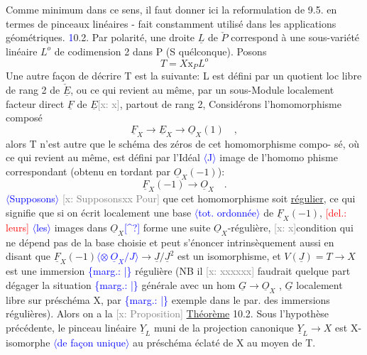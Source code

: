 \documentclass[11pt]{article}
\newcommand{\scanpage}[1]{\par\bigskip\noindent{\small\sffamily[scan #1]}\par}
\newcommand{\mspage}[1]{{\small\sffamily[p.\,#1]}}
\newcommand{\hand}[1]{\textcolor{blue}{#1}}
\let\over\relax
\newcommand{\over}[2]{\textcolor{gray}{#1}\textcolor{blue}{\ensuremath{^{\!\nearrow}}#2}}
\newcommand{\inserted}[2][]{\textcolor{blue}{$\langle$#2$\rangle$}}
\newcommand{\margin}[1]{\textcolor{blue}{\{\textsf{marg.:} #1\}}}
\newcommand{\deleted}[1]{\textcolor{red}{[\textsf{del.:} #1]}}
\newcommand{\xout}[1]{\textcolor{gray}{[\textsf{x:} #1]}}
\newcommand{\uline}[1]{\underline{#1}}
\newcommand{\unsure}[1]{[#1?]}
\begin{document}
\mspage{58}

\clearpage
\scanpage{25/59}
\mspage{59}

Comme minimum dans ce sens, il faut  donner ici la reformulation de 9.5.
en termes de pinceaux linéaires  -  fait constamment utilisé dans les
applications géométriques.
\hand{1}0.2.  Par polarité, une droite $\underline{L}$  de $\check{P}$  correspond à une sous-variété
linéaire $L^{o}$ de codimension 2 dans P  (S quélconque).  Posons
\[ T = X\mathrm{x}_{P}L^{o} \]
Une autre façon  de décrire T est la suivante:  L  est défini par un
quotient loc libre de rang 2 de $\check{\underline{E}}$, ou ce qui revient au même, par un
sous-Module localement facteur direct  $\underline{F}$ de $\underline{E}$\xout{x}, partout de rang 2,
Considérons  l'homomorphisme composé
\[ \underline{F}_{X} \longrightarrow \underline{E}_{X} \longrightarrow \underline{O}_{X}(1) \quad , \]
alors  T n'est autre que  le schéma des zéros de cet homomorphisme compo-%
sé, où ce qui revient au même, est défini par l'Idéal \inserted[typed]{J} image de l'homomo%
phisme correspondant (obtenu en tordant par $\underline{O}_{X}(-1)$):
\[ \underline{F}_{X}(-1) \longrightarrow \underline{O}_{X} \quad . \]
\inserted[typed]{Supposons}
\xout{Supposonsxx Pour} que cet homomorphisme soit \uline{régulier}, ce qui signifie
que  si on écrit localement une base \inserted{tot. ordonnée} de $\underline{F}_{X}(-1)$, \deleted{leurs} \inserted{les} images dans $\underline{O}_{X}$\hand{\unsure{\^{}}}
forme\over{\unsure{nt}}{nt} une suite $\underline{O}_{X}$-régulière, \xout{x}condition qui ne dépend pas de la base
choisie et peut s'énoncer intrinsèquement aussi en disant que
$\underline{F}_{X}(-1)$\inserted{$\otimes\ \underline{O}_{X}/J$}$\to \underline{J}/\underline{J}^{2}$  est un isomorphisme, et  $V(\underline{J})=T \longrightarrow X$  est  une immersion
\margin{|} régulière  (NB il \xout{xxxxxx} faudrait quelque part dégager la situation
\margin{|} générale avec un hom  $\underline{G} \to \underline{O}_{X}$ , $\underline{G}$ localement libre sur préschéma X, par
\margin{|} exemple dans le par. des immersions régulières).  Alors on a la
\xout{Proposition} \uline{Théorème}  10.2.   Sous l'hypothèse précédente, le pinceau
linéaire $\underline{Y}_{L}$  muni de la projection canonique $\underline{Y}_{L} \longrightarrow X$  est  X-isomorphe
\inserted{de façon unique} au préschéma éclaté  de X au moyen de T.
\end{document}
